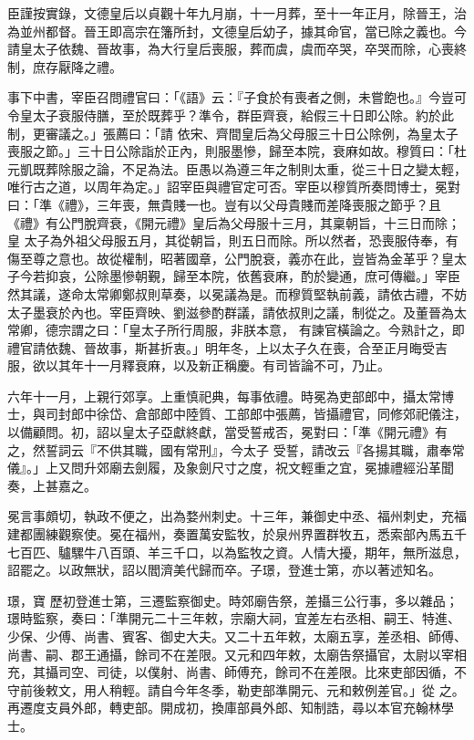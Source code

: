 \begin{pinyinscope}
 臣謹按實錄，文德皇后以貞觀十年九月崩，十一月葬，至十一年正月，除晉王，治為並州都督。晉王即高宗在籓所封，文德皇后幼子，據其命官，當已除之義也。今請皇太子依魏、晉故事，為大行皇后喪服，葬而虞，虞而卒哭，卒哭而除，心喪終制，庶存厭降之禮。



 事下中書，宰臣召問禮官曰：「《語》云：『子食於有喪者之側，未嘗飽也。』今豈可令皇太子衰服侍膳，至於既葬乎？準令，群臣齊衰，給假三十日即公除。約於此制，更審議之。」張薦曰：「請
 依宋、齊間皇后為父母服三十日公除例，為皇太子喪服之節。」三十日公除詣於正內，則服墨慘，歸至本院，衰麻如故。穆質曰：「杜元凱既葬除服之論，不足為法。臣愚以為遵三年之制則太重，從三十日之變太輕，唯行古之道，以周年為定。」詔宰臣與禮官定可否。宰臣以穆質所奏問博士，冕對曰：「準《禮》，三年喪，無貴賤一也。豈有以父母貴賤而差降喪服之節乎？且《禮》有公門脫齊衰，《開元禮》皇后為父母服十三月，其稟朝旨，十三日而除；皇
 太子為外祖父母服五月，其從朝旨，則五日而除。所以然者，恐喪服侍奉，有傷至尊之意也。故從權制，昭著國章，公門脫衰，義亦在此，豈皆為金革乎？皇太子今若抑哀，公除墨慘朝覲，歸至本院，依舊衰麻，酌於變通，庶可傳繼。」宰臣然其議，遂命太常卿鄭叔則草奏，以冕議為是。而穆質堅執前義，請依古禮，不妨太子墨衰於內也。宰臣齊映、劉滋參酌群議，請依叔則之議，制從之。及董晉為太常卿，德宗謂之曰：「皇太子所行周服，非朕本意，
 有諫官橫論之。今熟計之，即禮官請依魏、晉故事，斯甚折衷。」明年冬，上以太子久在喪，合至正月晦受吉服，欲以其年十一月釋衰麻，以及新正稱慶。有司皆論不可，乃止。



 六年十一月，上親行郊享。上重慎祀典，每事依禮。時冕為吏部郎中，攝太常博士，與司封郎中徐岱、倉部郎中陸質、工部郎中張薦，皆攝禮官，同修郊祀儀注，以備顧問。初，詔以皇太子亞獻終獻，當受誓戒否，冕對曰：「準《開元禮》有之，然誓詞云『不供其職，國有常刑』，今太子
 受誓，請改云『各揚其職，肅奉常儀』。」上又問升郊廟去劍履，及象劍尺寸之度，祝文輕重之宜，冕據禮經沿革聞奏，上甚嘉之。



 冕言事頗切，執政不便之，出為婺州刺史。十三年，兼御史中丞、福州刺史，充福建都團練觀察使。冕在福州，奏置萬安監牧，於泉州界置群牧五，悉索部內馬五千七百匹、驢騾牛八百頭、羊三千口，以為監牧之資。人情大擾，期年，無所滋息，詔罷之。以政無狀，詔以閻濟美代歸而卒。子璟，登進士第，亦以著述知名。



 璟，寶
 歷初登進士第，三遷監察御史。時郊廟告祭，差攝三公行事，多以雜品；璟時監察，奏曰：「準開元二十三年敕，宗廟大祠，宜差左右丞相、嗣王、特進、少保、少傅、尚書、賓客、御史大夫。又二十五年敕，太廟五享，差丞相、師傅、尚書、嗣、郡王通攝，餘司不在差限。又元和四年敕，太廟告祭攝官，太尉以宰相充，其攝司空、司徒，以僕射、尚書、師傅充，餘司不在差限。比來吏部因循，不守前後敕文，用人稍輕。請自今年冬季，勒吏部準開元、元和敕例差官。」從
 之。再遷度支員外郎，轉吏部。開成初，換庫部員外郎、知制誥，尋以本官充翰林學士。




\end{pinyinscope}
